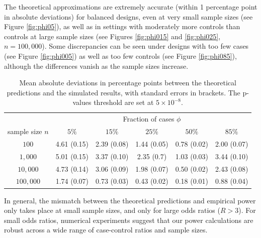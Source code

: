 The theoretical approximations are extremely accurate (within 1 percentage point in absolute deviations) for balanced designs, even at very small sample sizes (see Figure \ref{fig:phi05}), as well as in settings with moderately more controls than controls at large sample sizes (see Figures \ref{fig:phi015} and \ref{fig:phi025}, $n=100,000$).
Some discrepancies can be seen under designs with too few cases (see Figure \ref{fig:phi005}) as well as too few controls (see Figure \ref{fig:phi085}), although the differences vanish as the sample sizes increase.

\begin{table}[h]
\begin{center}
    \begin{tabular}{cccccc}
    \hline
        & \multicolumn{5}{c}{Fraction of cases $\phi$} \\
        \cline{2-6}
        sample size $n$ & $5\%$ & $15\%$ & $25\%$ & $50\%$ & $85\%$ \\
        \hline
        $100$ & 4.61 (0.15) & 2.39 (0.08) & 1.44 (0.05) & 0.78 (0.02) & 2.00 (0.07) \\
        $1,000$ & 5.01 (0.15) & 3.37 (0.10) & 2.35 (0.7) & 1.03 (0.03) & 3.44 (0.10) \\
        $10,000$ & 4.73 (0.14) & 3.06 (0.09) & 1.98 (0.07) & 0.50 (0.02) & 2.43 (0.08) \\
        $100,000$ & 1.74 (0.07) & 0.73 (0.03) & 0.43 (0.02) & 0.18 (0.01) & 0.88 (0.04) \\
    \hline
    \end{tabular}
    \caption{Mean absolute deviations in percentage points between the theoretical predictions and the simulated results, with standard errors in brackets. The p-values threshold are set at $5\times10^{-8}$.}
    \label{tbl:accuracy-of-asymptotic-power}
\end{center}
\end{table}


In general, the mismatch between the theoretical predictions and empirical power only takes place at small sample sizes, and only for large odds ratios ($R>3$).
For small odds ratios, numerical experiments suggest that our power calculations are robust across a wide range of case-control ratios and sample sizes.

